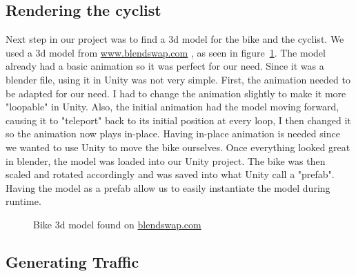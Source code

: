 \documentclass{scrartcl}
\begin{document}
	\subsection{Rendering the cyclist}
		Next step in our project was to find a 3d model for the bike and the cyclist. We used a 3d model from \url{www.blendswap.com} \parencite{Bicycle:Blender}, as 
		seen in figure~\ref{fig:bike_model}. The model already had a basic animation so it was perfect for our need. Since it 
		was a blender file, using it in Unity was not very simple. First, the animation needed to be adapted for our need. I had to change the 
		animation slightly to make it more "loopable" in Unity. Also, the initial animation had the model moving forward, causing it to "teleport" 
		back to its initial position at every loop, I then changed it so the animation now plays in-place. Having in-place animation is needed 
		since we wanted to use Unity to move the bike ourselves. Once everything looked great in blender, the model was loaded into our Unity 
		project. The bike was then scaled and rotated accordingly and was saved into what Unity call a "prefab". Having the model as a prefab allow 
		us to easily instantiate the model during runtime.		
		
		\begin{figure}[h]
			\caption{Bike 3d model found on \url{blendswap.com}}
			\label{fig:bike_model}
		\end{figure}
		
	\subsection{Generating Traffic}
		


\printbibliography
\end{document}
